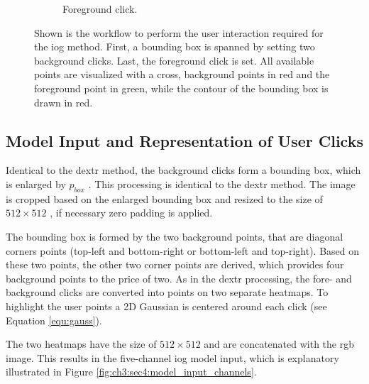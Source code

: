 \begin{figure}
\begin{subfigure}[b]{0.3\textwidth}
		\caption{Foreground click.}
		\label{fig:ch3:sec4:iog_workflow_3}
	\end{subfigure}
	\caption[IOG User Interaction]{
		Shown is the workflow to perform the user interaction required for the \gls{iog} method.
		First, a bounding box is spanned by setting two background clicks.
		Last, the foreground click is set.
		All available points are visualized with a cross, background points in red and the foreground point in green, while the contour of the bounding box is drawn in red.
	} 
	\label{fig:ch3:sec4:iog_user_clicks}
\end{figure}

\subsection{Model Input and Representation of User Clicks}\label{ord:ch3:sec4:subsec2}

Identical to the \gls{dextr} method, the background clicks form a bounding box, which is enlarged by  $p_{{box}}$ .
This processing is identical to the \gls{dextr} method.
The image is cropped based on the enlarged bounding box and resized to the size of $512 \times 512$ , if necessary zero padding is applied.

The bounding box is formed by the two background points, that are diagonal corners points (top-left and bottom-right or bottom-left and top-right).
Based on these two points, the other two corner points are derived, which provides four background points to the price of two.
As in the \gls{dextr} processing, the fore- and background clicks are converted into points on two separate heatmaps.
To highlight the user points a 2D Gaussian is centered around each click (see Equation \ref{equ:gauss}).

The two heatmaps have the size of $512 \times 512$  and are concatenated with the \Gls{rgb} image.
This results in the five-channel \gls{iog} model input, which is explanatory illustrated in Figure \ref{fig:ch3:sec4:model_input_channels}.

